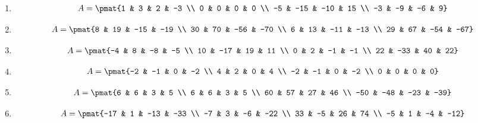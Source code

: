 \begin{enumerate}
\item

\begin{align*}
A = \pmat{1 & 3 & 2 & -3 \\ 0 & 0 & 0 & 0 \\ -5 & -15 & -10 & 15 \\ -3 & -9 & -6 & 9}
\end{align*}

\item

\begin{align*}
A = \pmat{8 & 19 & -15 & -19 \\ 30 & 70 & -56 & -70 \\ 6 & 13 & -11 & -13 \\ 29 & 67 & -54 & -67}
\end{align*}

\item

\begin{align*}
A = \pmat{-4 & 8 & -8 & -5 \\ 10 & -17 & 19 & 11 \\ 0 & 2 & -1 & -1 \\ 22 & -33 & 40 & 22}
\end{align*}

\item

\begin{align*}
A = \pmat{-2 & -1 & 0 & -2 \\ 4 & 2 & 0 & 4 \\ -2 & -1 & 0 & -2 \\ 0 & 0 & 0 & 0}
\end{align*}

\item

\begin{align*}
A = \pmat{6 & 6 & 3 & 5 \\ 6 & 6 & 3 & 5 \\ 60 & 57 & 27 & 46 \\ -50 & -48 & -23 & -39}
\end{align*}

\item

\begin{align*}
A = \pmat{-17 & 1 & -13 & -33 \\ -7 & 3 & -6 & -22 \\ 33 & -5 & 26 & 74 \\ -5 & 1 & -4 & -12}
\end{align*}


\end{enumerate}
